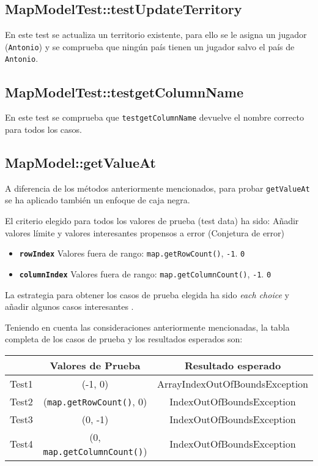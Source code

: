 \subsection {MapModelTest::testUpdateTerritory}

En este test se actualiza un territorio existente, para ello se le asigna un jugador (\texttt{Antonio}) y se comprueba que ningún país tienen un jugador salvo el país de \texttt{Antonio}. 

\subsection {MapModelTest::testgetColumnName}

En este test se comprueba que \texttt{testgetColumnName} devuelve el nombre correcto para todos los casos.

\subsection {MapModel::getValueAt}

A diferencia de  los métodos anteriormente mencionados, para probar \texttt{getValueAt} se ha aplicado también un enfoque de caja negra.

El criterio elegido para todos los valores de prueba (test data) ha sido: Añadir valores límite y valores interesantes propensos a error (Conjetura de error)  
\begin{itemize}
\item \textbf{\texttt{rowIndex}}
\subitem  Valores fuera de rango: \texttt{map.getRowCount()}, \texttt{-1}.
\subitem \texttt{0}

\item \textbf{\texttt{columnIndex}}
\subitem  Valores fuera de rango: \texttt{map.getColumnCount()}, \texttt{-1}.
\subitem \texttt{0}
\end{itemize}

La estrategia para obtener los casos de prueba elegida ha sido
\textit{each choice}  y añadir algunos casos interesantes .


Teniendo en cuenta las consideraciones anteriormente mencionadas, la tabla completa de los casos de prueba y los resultados esperados son:

{\footnotesize
\begin{longtable}[c]{lcc}
 & \textbf{Valores de Prueba}  & \textbf{Resultado esperado} \\
\hline \hline
\endhead
Test1 & (-1, 0)  & ArrayIndexOutOfBoundsException\\
Test2 & (\texttt{map.getRowCount()}, 0) &  IndexOutOfBoundsException\\
Test3 & (0, -1)  & IndexOutOfBoundsException\\
Test4 & (0, \texttt{map.getColumnCount()}) &  IndexOutOfBoundsException\\
\hline
\end{longtable}
}

